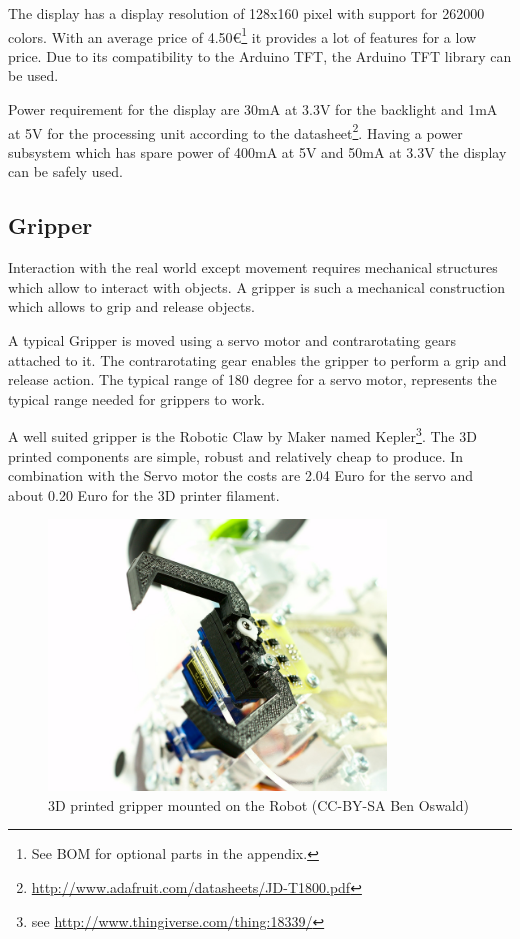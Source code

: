 The display has a display resolution of 128x160 pixel with support for 262000 colors. With an average price of 4.50\euro\footnote{See BOM for optional parts in the appendix.} it provides a lot of features for a low price. Due to its compatibility to the Arduino TFT, the Arduino TFT library can be used.

Power requirement for the display are 30mA at 3.3V for the backlight and 1mA at 5V for the processing unit according to the datasheet\footnote{\url{http://www.adafruit.com/datasheets/JD-T1800.pdf}}. Having a power subsystem which has spare power of 400mA at 5V and 50mA at 3.3V the display can be safely used.

\subsection{Gripper}
Interaction with the real world except movement requires mechanical structures which allow to interact with objects. A gripper is such a mechanical construction which allows to grip and release objects.

A typical Gripper is moved using a servo motor and contrarotating gears attached to it. The contrarotating gear enables the gripper to perform a grip and release action. The typical range of 180 degree for a servo motor, represents the typical range needed for grippers to work. 

A well suited gripper is the Robotic Claw by Maker named Kepler\footnote{see \url{http://www.thingiverse.com/thing:18339/}}. The 3D printed components are simple, robust and relatively cheap to produce. In combination with the Servo motor the costs are 2.04 Euro for the servo and about 0.20 Euro for the 3D printer filament.

\begin{figure}[H]
  \centering
  \includegraphics[width=0.8\textwidth]{images/30_gripper.jpg}
  \caption{3D printed gripper mounted on the Robot (CC-BY-SA Ben Oswald)}
\end{figure}


